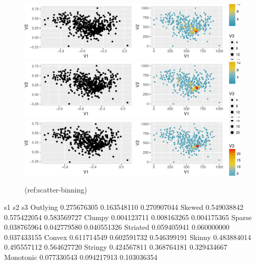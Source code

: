 \documentclass[article]{jss}
\begin{document}
\begin{CodeChunk}
\begin{figure}

{\centering \includegraphics[width=\textwidth]{figure/scatter-binning-1} \includegraphics[width=\textwidth]{figure/scatter-binning-2} \includegraphics[width=\textwidth]{figure/scatter-binning-3} 

}

\caption[(ref:scatter-binning)]{(ref:scatter-binning)}\label{fig:scatter-binning}
\end{figure}
\end{CodeChunk}

\begin{CodeChunk}

\begin{CodeOutput}
                   s1          s2          s3
Outlying  0.275676305 0.163548110 0.270907044
Skewed    0.549038842 0.575422054 0.583569727
Clumpy    0.004123711 0.008163265 0.004175365
Sparse    0.038765964 0.042779580 0.040551326
Striated  0.059405941 0.060000000 0.037433155
Convex    0.611714549 0.602591732 0.546399191
Skinny    0.483884014 0.495557112 0.564627720
Stringy   0.424567811 0.368764181 0.329434667
Monotonic 0.077330543 0.094217913 0.103036354
\end{CodeOutput}
\end{CodeChunk}
\end{document}
